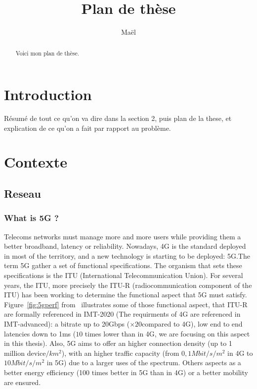 \documentclass[a4paper,10pt]{article}
\title{Plan de thèse}
\author{Maël}
\begin{document}
 
\maketitle

\begin{abstract}
Voici mon plan de thèse.
\end{abstract}
\section{Introduction}
Résumé  de tout ce qu'on va dire dans la section 2, puis plan de la these, et explication de ce qu'on a fait par rapport au problème.

\section{Contexte}

\subsection{Reseau}

\subsubsection{What is 5G ?}



Telecoms networks must manage more and more users while providing them a better broadband, latency or reliability. Nowadays, 4G is the standard deployed in most of the territory, and a new technology is starting to be deployed: 5G.The term 5G gather a set of functional specifications. The organism that sets these specifications is the ITU (International Telecommunication Union). For several years, the ITU, more precisely the ITU-R (radiocommunication component of the ITU) has been working to determine the functional aspect that 5G must satisfy. Figure~\ref{fig:5gperf} from~\cite{dahlman20185g} illustrates some of those functional aspect, that ITU-R are formally referenced in IMT-2020 (The requirments of 4G are referenced in IMT-advanced): a bitrate up to 20Gbps ($\times 20 $compared to 4G), low end to end latencies down to 1ms ($10$ times lower than in 4G, we are focusing on this aspect in this thesis).
Also, 5G aims to offer an higher connection density (up to 1 million device$/km^2$), with an higher traffic capacity (from $0,1 Mbit/s/m^2$ in 4G to $10 Mbit/s/m^2$ in 5G) due to a larger uses of the spectrum. Others aspects as a better energy efficiency (100 times better in 5G than in 4G) or a better mobility are ensured. 
\end{document}
